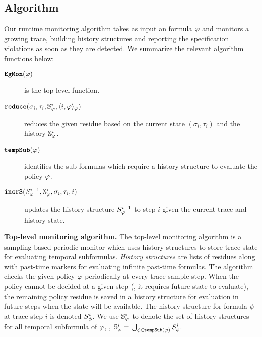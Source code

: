 

\subsection{\monitor Algorithm}
Our runtime monitoring algorithm \monitor takes as input an \planguage formula $\policy$ and monitors a growing trace, building history structures and reporting the specification violations as soon as they are detected. We summarize the relevant algorithm functions below:

\begin{description}
\item[$\monitor{}(\policy)$] is the top-level function. 
\item[$\reduce(\sigma_i, \tau_i, \histSt{i}, \rpt{i}{\policy}{\policy})$] reduces the given residue based on the current state $(\sigma_i,\tau_i)$ and the history $\histSt{i}$.
\item[$\tempSub(\policy)$] identifies the sub-formulas which require a history structure to evaluate the policy $\policy$.
\item[$\incrS(\histst{i-1}, \histSt{i}, \sigma_i, \tau_i, i)$] updates the history structure $\histst{i-1}$ to step $i$ given the current trace and history state.
\end{description}




\textbf{Top-level monitoring algorithm.}
The top-level monitoring algorithm \monitor is a sampling-based periodic monitor which uses history structures to store trace state for evaluating temporal subformulas. 
\emph{History structures} are lists of residues along with past-time markers for evaluating infinite past-time formulas. 
The algorithm checks the given policy $\policy$ periodically at every trace sample step. 
When the policy cannot be decided at a given step (\eg, it requires future state to evaluate), the remaining policy residue is saved in a history structure for evaluation in future steps when the state will be available. 
The history structure for formula $\policyv$ at trace step $i$ is denoted $\histst[\policyv]{i}$. 
We use $\histSt[\policy]{i}$ to denote the set of history structures for all temporal subformula of $\policy$, \ie, 
$\histSt[\policy]{i} = \bigcup_{\policyv \in \tempSub(\policy)} \histst[\policyv]{i}$.

